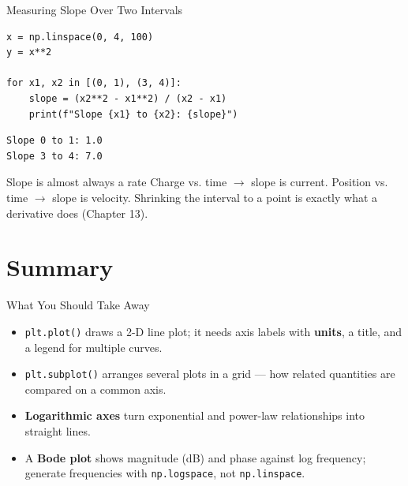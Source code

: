 \documentclass[9pt,aspectratio=169,xcolor=table]{beamer}
\begin{document}
\begin{frame}[fragile]{Measuring Slope Over Two Intervals}
    \leavevmode
\begin{lstlisting}
x = np.linspace(0, 4, 100)
y = x**2

for x1, x2 in [(0, 1), (3, 4)]:
    slope = (x2**2 - x1**2) / (x2 - x1)
    print(f"Slope {x1} to {x2}: {slope}")
\end{lstlisting}
\begin{lstlisting}[style=skoutput]
Slope 0 to 1: 1.0
Slope 3 to 4: 7.0
\end{lstlisting}

    \vspace{1mm}
    \begin{alertblock}{Slope is almost always a rate}
        Charge vs. time $\to$ slope is current. Position vs. time $\to$
        slope is velocity. Shrinking the interval to a point is exactly
        what a \alert{derivative} does (Chapter 13).
    \end{alertblock}
\end{frame}

\section{Summary}

\begin{frame}{What You Should Take Away}
    \leavevmode
    \small
    \begin{itemize}
        \item \texttt{plt.plot()} draws a 2-D line plot; it needs axis
              labels with \textbf{units}, a title, and a legend for
              multiple curves.
        \item \texttt{plt.subplot()} arranges several plots in a grid
              --- how related quantities are compared on a common axis.
        \item \textbf{Logarithmic axes} turn exponential and power-law
              relationships into straight lines.
        \item A \textbf{Bode plot} shows magnitude (dB) and phase
              against log frequency; generate frequencies with
              \texttt{np.logspace}, not \texttt{np.linspace}.
    \end{itemize}
\end{frame}
\end{document}
